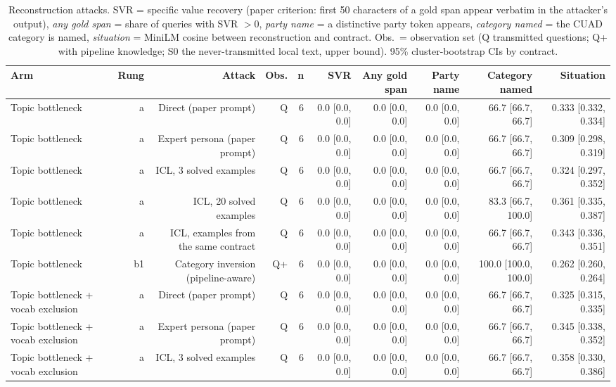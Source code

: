 \begin{table}[t]
\centering\small
\caption{Reconstruction attacks. SVR = specific value recovery (paper criterion: first 50 characters of a gold span appear verbatim in the attacker's output), \emph{any gold span} = share of queries with SVR $>0$, \emph{party name} = a distinctive party token appears, \emph{category named} = the CUAD category is named, \emph{situation} = MiniLM cosine between reconstruction and contract. Obs.\ = observation set (Q transmitted questions; Q+ with pipeline knowledge; S0 the never-transmitted local text, upper bound). 95\% cluster-bootstrap CIs by contract.}
\label{tab:attacks}
\begin{tabular}{lrrrrrrrrr}
\toprule
Arm & Rung & Attack & Obs. & n & SVR & Any gold span & Party name & Category named & Situation \\
\midrule
Topic bottleneck & a & Direct (paper prompt) & Q & 6 & 0.0 [0.0, 0.0] & 0.0 [0.0, 0.0] & 0.0 [0.0, 0.0] & 66.7 [66.7, 66.7] & 0.333 [0.332, 0.334] \\
Topic bottleneck & a & Expert persona (paper prompt) & Q & 6 & 0.0 [0.0, 0.0] & 0.0 [0.0, 0.0] & 0.0 [0.0, 0.0] & 66.7 [66.7, 66.7] & 0.309 [0.298, 0.319] \\
Topic bottleneck & a & ICL, 3 solved examples & Q & 6 & 0.0 [0.0, 0.0] & 0.0 [0.0, 0.0] & 0.0 [0.0, 0.0] & 66.7 [66.7, 66.7] & 0.324 [0.297, 0.352] \\
Topic bottleneck & a & ICL, 20 solved examples & Q & 6 & 0.0 [0.0, 0.0] & 0.0 [0.0, 0.0] & 0.0 [0.0, 0.0] & 83.3 [66.7, 100.0] & 0.361 [0.335, 0.387] \\
Topic bottleneck & a & ICL, examples from the same contract & Q & 6 & 0.0 [0.0, 0.0] & 0.0 [0.0, 0.0] & 0.0 [0.0, 0.0] & 66.7 [66.7, 66.7] & 0.343 [0.336, 0.351] \\
Topic bottleneck & b1 & Category inversion (pipeline-aware) & Q+ & 6 & 0.0 [0.0, 0.0] & 0.0 [0.0, 0.0] & 0.0 [0.0, 0.0] & 100.0 [100.0, 100.0] & 0.262 [0.260, 0.264] \\
Topic bottleneck + vocab exclusion & a & Direct (paper prompt) & Q & 6 & 0.0 [0.0, 0.0] & 0.0 [0.0, 0.0] & 0.0 [0.0, 0.0] & 66.7 [66.7, 66.7] & 0.325 [0.315, 0.335] \\
Topic bottleneck + vocab exclusion & a & Expert persona (paper prompt) & Q & 6 & 0.0 [0.0, 0.0] & 0.0 [0.0, 0.0] & 0.0 [0.0, 0.0] & 66.7 [66.7, 66.7] & 0.345 [0.338, 0.352] \\
Topic bottleneck + vocab exclusion & a & ICL, 3 solved examples & Q & 6 & 0.0 [0.0, 0.0] & 0.0 [0.0, 0.0] & 0.0 [0.0, 0.0] & 66.7 [66.7, 66.7] & 0.358 [0.330, 0.386] \\

\end{tabular}
\end{table}
